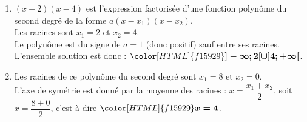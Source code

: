 \documentclass[a4paper,11pt,landscape,exos]{nsi} %
\begin{document}
\begin{multicols}{2}
\begin{enumerate}[itemsep=1em]
    \item $(x-2)(x-4)$ est l'expression factorisée d'une fonction polynôme du second degré de la forme $a(x-x_1)(x-x_2)$.\\
        Les racines sont $x_1=2$ et $x_2=4$. \\
        Le polynôme est du signe de $a=1$ (donc positif) sauf entre ses racines.\\
        L'ensemble solution est donc :  ${\color[HTML]{f15929}\boldsymbol{]-\infty;2[\cup]4;+\infty[}}$.   
         
    \item Les racines de ce polynôme du second degré sont $x_1=8$ et $x_2=0$.\\
        L'axe de symétrie est donné par la moyenne des racines : $x=\dfrac{x_1+x_2}{2}$, soit $x=\dfrac{8+0}{2}$, c'est-à-dire ${\color[HTML]{f15929}\boldsymbol{x=4}}$.
\end{enumerate}
\end{multicols}
\end{document}
